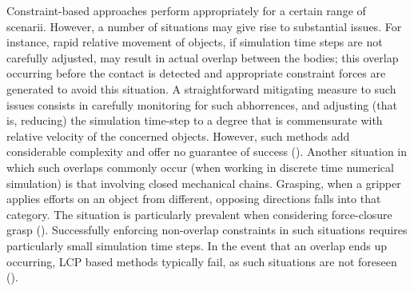 Constraint-based approaches perform appropriately for a certain range of scenarii. However, a number of situations may give rise to substantial issues. For instance, rapid relative movement of objects, if simulation time steps are not carefully adjusted, may result in actual overlap between the bodies; this overlap occurring before the contact is detected and appropriate constraint forces are generated to avoid this situation. A straightforward mitigating measure to such issues consists in carefully monitoring for such abhorrences, and adjusting (that is, reducing) the simulation time-step to a degree that is commensurate with relative velocity of the concerned objects. However, such methods add considerable complexity and offer no guarantee of success (\cite{engine_simulation}). Another situation in which such overlaps commonly occur (when working in discrete time numerical simulation) is that involving closed mechanical chains. Grasping, when a gripper applies efforts on an object from different, opposing directions falls into that category. The situation is particularly prevalent when considering force-closure grasp (\cite{nguyen1988constructing}). Successfully enforcing non-overlap constraints in such situations requires particularly small simulation time steps. In the event that an overlap ends up occurring, LCP based methods typically fail, as such situations are not foreseen (\cite{baraff_analytical}).

